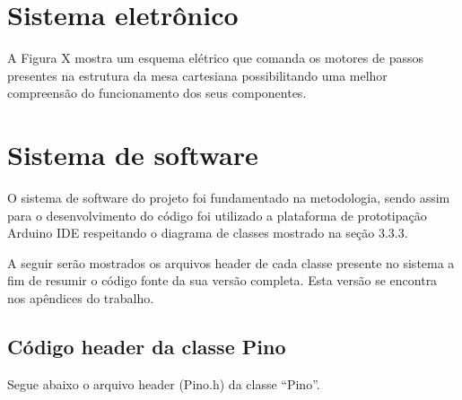 \section{Sistema eletrônico}\label{sec:ressisele}

A Figura X mostra um esquema elétrico que comanda os motores de passos presentes na estrutura  da mesa 
cartesiana possibilitando uma melhor compreensão do funcionamento dos seus componentes.

%
%


\section{Sistema de software}\label{sec:ressissof}

O sistema de software do projeto foi fundamentado na metodologia, sendo assim para o desenvolvimento 
do código foi utilizado a plataforma de prototipação Arduino IDE respeitando o diagrama de classes 
mostrado na seção 3.3.3.

A seguir serão mostrados os arquivos header de cada classe presente no sistema a fim de resumir 
o código fonte da sua versão completa. Esta versão se encontra nos apêndices do trabalho.

\subsection{Código header da classe Pino}\label{subsec:respino}

Segue abaixo o arquivo header (Pino.h) da classe “Pino”.

